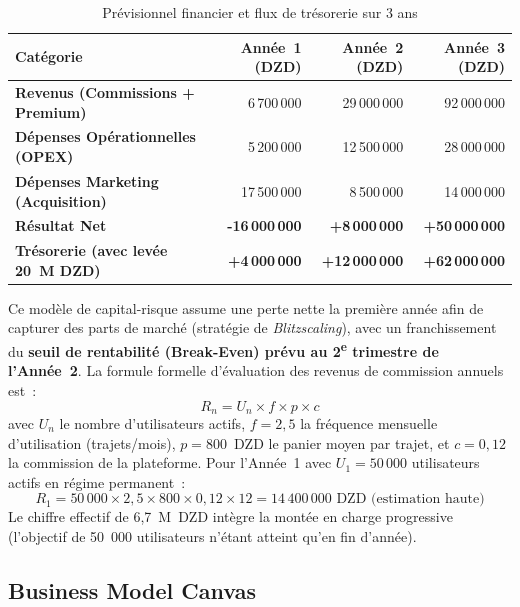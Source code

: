 \begin{table}[H]
\centering
\begin{tabularx}{\textwidth}{|X|r|r|r|}
\hline
\rowcolor{rohlight}
\textbf{Catégorie} & \textbf{Année~1 (DZD)} & \textbf{Année~2 (DZD)} & \textbf{Année~3 (DZD)} \\
\hline
\textbf{Revenus (Commissions + Premium)} & 6\,700\,000 & 29\,000\,000 & 92\,000\,000 \\
\hline
\textbf{Dépenses Opérationnelles (OPEX)} & 5\,200\,000 & 12\,500\,000 & 28\,000\,000 \\
\hline
\textbf{Dépenses Marketing (Acquisition)} & 17\,500\,000 & 8\,500\,000 & 14\,000\,000 \\
\hline
\rowcolor{rohlight!40}
\textbf{Résultat Net} & \textbf{-16\,000\,000} & \textbf{+8\,000\,000} & \textbf{+50\,000\,000} \\
\hline
\rowcolor{rohlight}
\textbf{Trésorerie (avec levée 20~M DZD)} & \textbf{+4\,000\,000} & \textbf{+12\,000\,000} & \textbf{+62\,000\,000} \\
\hline
\end{tabularx}
  \caption{Prévisionnel financier et flux de trésorerie sur 3 ans}
\end{table}

Ce modèle de capital-risque assume une perte nette la première année afin de capturer des parts de marché (stratégie de \textit{Blitzscaling}), avec un franchissement du \textbf{seuil de rentabilité (Break-Even) prévu au 2\textsuperscript{e} trimestre de l'Année~2}. La formule formelle d'évaluation des revenus de commission annuels est~:
$$R_n = U_n \times f \times p \times c$$
avec $U_n$ le nombre d'utilisateurs actifs, $f = 2{,}5$ la fréquence mensuelle d'utilisation (trajets/mois), $p = 800$~DZD le panier moyen par trajet, et $c = 0{,}12$ la commission de la plateforme. Pour l'Année~1 avec $U_1 = 50\,000$ utilisateurs actifs en régime permanent~:
$$R_1 = 50\,000 \times 2{,}5 \times 800 \times 0{,}12 \times 12 = 14\,400\,000 \text{~DZD (estimation haute)}$$
Le chiffre effectif de 6,7~M~DZD intègre la montée en charge progressive (l'objectif de 50~000 utilisateurs n'étant atteint qu'en fin d'année).

\subsection{Business Model Canvas}

